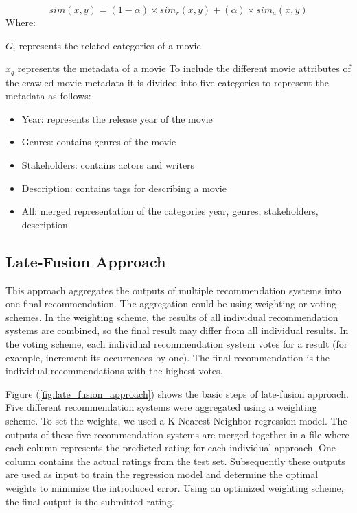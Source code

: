 \documentclass{sigish}
\begin{document}
\begin{equation}
sim(x, y) = (1 - \alpha) \times sim_{r}(x, y) + (\alpha) \times sim_{a}(x, y)
\end{equation}
\newline
Where:

$ G_{i} $ represents the related categories of a movie

$ x_{q} $ represents the metadata of a movie
\newline
\newline
To include the different movie attributes of the crawled movie metadata it  is divided into five categories to represent the metadata as follows:
\begin{itemize}
	\item Year: represents the release year of the movie
	\item Genres: contains genres of the movie
	\item Stakeholders: contains actors and writers
	\item Description: contains tags for describing a movie
	\item All: merged representation of the categories year, genres, stakeholders, description
\end{itemize}

\subsection{Late-Fusion Approach}

This approach aggregates the outputs of multiple recommendation systems into one final recommendation. The aggregation could be using weighting or voting schemes. In the weighting scheme, the results of all individual recommendation systems are combined, so the final result may differ from all individual results. In the voting scheme, each individual recommendation system votes for a result (for example, increment its occurrences by one). The final recommendation is the individual recommendations with the highest votes.

Figure (\ref{fig:late_fusion_approach}) shows the basic steps of late-fusion approach. Five different recommendation systems were aggregated using a weighting scheme. To set the weights, we used a K-Nearest-Neighbor regression model. The outputs of these five recommendation systems are merged together in a file where each column represents the predicted rating for each individual approach. One column contains the actual ratings from the test set. Subsequently these outputs are used as input to train the regression model and determine the optimal weights to minimize the introduced error. Using an optimized weighting scheme, the final output is the submitted rating.
\end{document}
